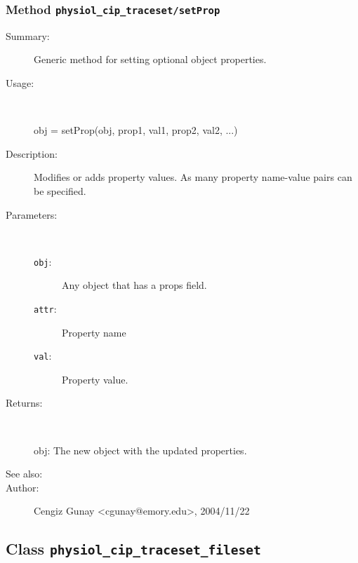 \subsubsection[Method \texttt{setProp}]{Method \texttt{physiol\_cip\_traceset/setProp}}%
%
\label{ref_physiol_cip_traceset__setProp}%
\hypertarget{ref_physiol_cip_traceset__setProp}{}%
\begin{description}
\item[Summary:]Generic method for setting optional object properties.
%
\item[Usage:]~%
\begin{lyxcode}%
obj = setProp(obj, prop1, val1, prop2, val2, ...)
%
\end{lyxcode}%
%
\item[Description:]%
Modifies or adds property values. As many property name-value 
 pairs can be specified.
\item[Parameters:]~
\begin{description}%
\item[\texttt{obj}:]
 Any object that has a props field.
\item[\texttt{attr}:]
 Property name
\item[\texttt{val}:]
 Property value.
\end{description}%
%
\item[Returns:
]~

	obj: The new object with the updated properties.
%
%
\item[See also:]%
%
\item[Author:]%
Cengiz Gunay <cgunay@emory.edu>, 2004/11/22
%
\end{description}
\methodline%
\subsection{Class \texttt{physiol\_cip\_traceset\_fileset}}%
%
\label{ref_physiol_cip_traceset_fileset}%
\hypertarget{ref_physiol_cip_traceset_fileset}{}%
